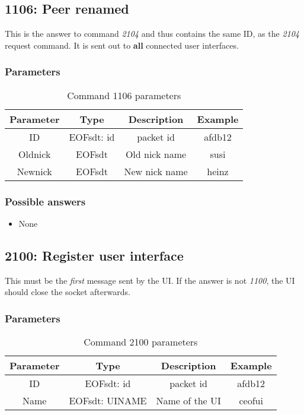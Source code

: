 \subsection{1106: Peer renamed}
This is the answer to command \emph{2104} and thus contains the
same ID, as the \emph{2104} request command. It is sent out to
\textbf{all} connected user interfaces.
\subsubsection{Parameters}
\begin{longtable}{|c|c|c|c|}
\caption{Command 1106 parameters}\\
\hline
\textbf{Parameter} & \textbf{Type} & \textbf{Description} & \textbf{Example}\\
\hline
ID & EOFsdt: id & packet id & afdb12\\
\hline
Oldnick & EOFsdt & Old nick name & susi\\
\hline
Newnick & EOFsdt & New nick name & heinz\\
\hline
\end{longtable}
\subsubsection{Possible answers}
\begin{itemize}
\item None
\end{itemize}
\subsection{2100: Register user interface}
This must be the \emph{first} message sent by the UI. If the answer is not
\emph{1100}, the UI should close the socket afterwards.

\subsubsection{Parameters}
\begin{longtable}{|c|c|c|c|}
\caption{Command 2100 parameters}\\
\hline
\textbf{Parameter} & \textbf{Type} & \textbf{Description} & \textbf{Example}\\
\hline
ID & EOFsdt: id & packet id & afdb12\\
\hline
Name & EOFsdt: UINAME & Name of the UI & ceofui\\
\hline
\end{longtable}

